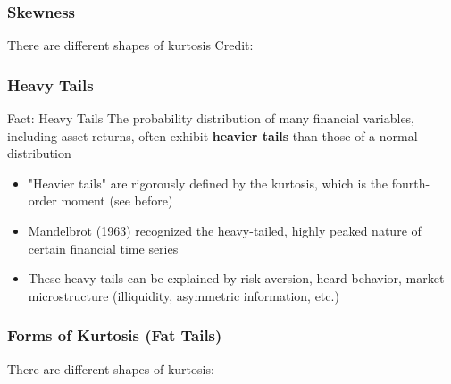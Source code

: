 \documentclass{beamer}
\begin{document}
\begin{frame}
  \frametitle{Skewness}
  There are different shapes of kurtosis 
  \hspace*{15pt}\hbox{\scriptsize Credit:} 
\end{frame}



\begin{frame}
  \frametitle{Heavy Tails}
  \begin{exampleblock}{Fact: Heavy Tails}
    The probability distribution of many financial variables, including asset returns, often exhibit \textbf{heavier tails} than those of a normal distribution
  \end{exampleblock}

  \begin{itemize}
  \item "Heavier tails" are rigorously defined by the kurtosis, which is the fourth-order moment (see before)
  \item Mandelbrot (1963) recognized the heavy-tailed, highly peaked nature of certain financial time series
  \item These heavy tails can be explained by risk aversion, heard behavior, market microstructure (illiquidity, asymmetric information, etc.)
  \end{itemize}    
\end{frame}


\begin{frame}
  \frametitle{Forms of Kurtosis (Fat Tails)}
  There are different shapes of kurtosis:\\ 
\end{frame}
\end{document}
